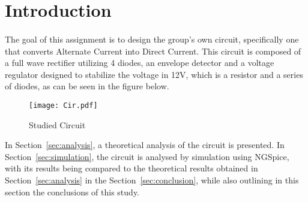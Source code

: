 \section{Introduction}
\label{sec:introduction}
\paragraph{}
\par The goal of this assignment is to design the group's own circuit, specifically one that converts Alternate Current into Direct Current. This circuit is composed of a full wave rectifier utilizing 4 diodes, an envelope detector and a voltage regulator designed to stabilize the voltage in 12V, which is a resistor and a series of diodes, as can be seen in the figure below.

\begin{figure}[H]
    \texttt{[image: Cir.pdf]}
    \centering
    \caption{Studied Circuit}
    \label{circuit}
\end{figure}


In Section~\ref{sec:analysis}, a theoretical analysis of the circuit is
presented. In Section~\ref{sec:simulation}, the circuit is analysed by
simulation using NGSpice, with its results being compared to the theoretical results obtained in
Section~\ref{sec:analysis} in the Section~\ref{sec:conclusion}, while also outlining in this section the conclusions of this study.
